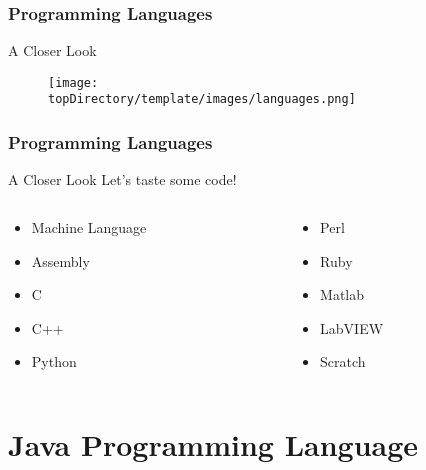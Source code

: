 \documentclass[10pt, compress]{beamer}
\begin{document}
\begin{frame}[fragile]
	\frametitle{Programming Languages}
	\begin{block}{A Closer Look}
		\begin{figure}\centering
			\texttt{[image: \\topDirectory/template/images/languages.png]}
		\end{figure}
	\end{block}
\end{frame}

\begin{frame}[fragile]
	\frametitle{Programming Languages}
	\begin{block}{A Closer Look}
		Let's taste some code!
		\begin{columns}
			\begin{column}{0.5\textwidth}
			\begin{itemize}
				\item[] Machine Language
				\item[] Assembly
				\item[] C
				\item[] C++
				\item[] Python
			\end{itemize}
			\end{column}
			\begin{column}{0.5\textwidth}
			\begin{itemize}
				\item[] Perl
				\item[] Ruby
				\item[] Matlab
				\item[] LabVIEW
				\item[] Scratch
			\end{itemize}
			\end{column}
		\end{columns}
	\end{block}
\end{frame}

\section{Java Programming Language}
\end{document}
